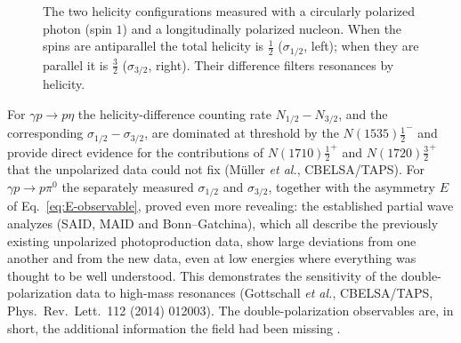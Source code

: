 \begin{figure}[htbp]
    \centering
    \caption{The two helicity configurations measured with a circularly polarized photon
    (spin $1$) and a longitudinally polarized nucleon. When the spins are antiparallel the
    total helicity is $\tfrac{1}{2}$ ($\sigma_{1/2}$, left); when they are parallel it is
    $\tfrac{3}{2}$ ($\sigma_{3/2}$, right). Their difference filters resonances by
    helicity.}
    \label{fig:helicity-config}
\end{figure}

For $\gamma p \to p\eta$ the helicity-difference counting rate $N_{1/2} - N_{3/2}$, and the
corresponding $\sigma_{1/2}-\sigma_{3/2}$, are dominated at threshold by the
$N(1535)\tfrac{1}{2}^-$ and provide direct evidence for the contributions of
$N(1710)\tfrac{1}{2}^+$ and $N(1720)\tfrac{3}{2}^+$ that the unpolarized data could not
fix (Müller \textit{et al.}, CBELSA/TAPS). For $\gamma p \to p\pi^0$ the separately measured
$\sigma_{1/2}$ and $\sigma_{3/2}$, together with the asymmetry $E$ of
Eq.~\eqref{eq:E-observable}, proved even more revealing: the established partial wave
analyzes (SAID, MAID and Bonn--Gatchina), which all describe the previously existing
unpolarized photoproduction data, show large deviations from one another and from the new
data, even at low energies where everything was thought to be well understood. This
demonstrates the sensitivity of the double-polarization data to high-mass resonances
(Gottschall \textit{et al.}, CBELSA/TAPS, Phys.\ Rev.\ Lett.\ 112 (2014) 012003). The
double-polarization observables are, in short, the additional information the field had
been missing \cite[Ch.~15]{Amsler2018}.

